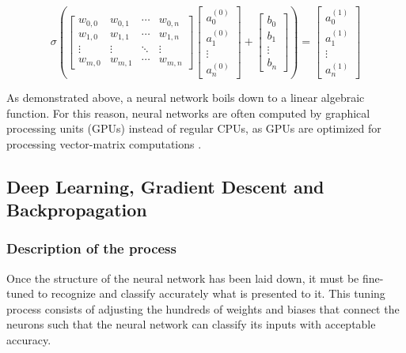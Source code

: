 ﻿\documentclass[12pt,a4paper,notitlepage]{article}
\begin{document}
\begin{displaymath}
 \sigma
 \left(
 \begin{bmatrix}
  w_{0,0} & w_{0,1} & \cdots & w_{0,n}\\
  w_{1,0} & w_{1,1} & \cdots & w_{1,n}\\
  \vdots & \vdots & \ddots & \vdots\\
  w_{m,0} & w_{m,1} & \cdots & w_{m,n}
 \end{bmatrix}
 \begin{bmatrix}
  a_{0}^{(0)}\\
  a_{1}^{(0)}\\
  \vdots\\
  a_{n}^{(0)}
 \end{bmatrix}
 +
 \begin{bmatrix}
  b_{0}\\
  b_{1}\\
  \vdots\\
  b_{n}
 \end{bmatrix}
 \right)
 =
 \begin{bmatrix}
  a_{0}^{(1)}\\
  a_{1}^{(1)}\\
  \vdots\\
  a_{n}^{(1)}
 \end{bmatrix}
\end{displaymath}

As demonstrated above, a neural network boils down to a linear algebraic function. For this reason, neural networks are often computed by graphical processing units (GPUs) instead of regular CPUs, as GPUs are optimized for processing vector-matrix computations \cite{salter_cart_2021}.

\subsection{Deep Learning, Gradient Descent and Backpropagation}\label{deep-learning}

\subsubsection{Description of the process}
Once the structure of the neural network has been laid down, it must be fine-tuned to recognize and classify accurately what is presented to it. This tuning process consists of adjusting the hundreds of weights and biases that connect the neurons such that the neural network can classify its inputs with acceptable accuracy.
\end{document}
